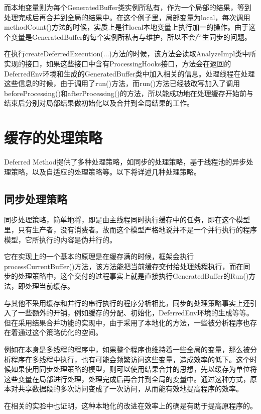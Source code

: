 而本地变量则为每个GeneratedBuffer类实例所私有，作为一个局部的结果，等到处理完成后再合并到全局的结果中。在这个例子里，局部变量为local，每次调用methodCount()方法的时候，实质上是往local本地变量上执行加一的操作。由于这个变量是GeneratedBuffer的每个实例所私有与维护，所以不会产生同步的问题。

在执行createDeferredExecution(...)方法的时候，该方法会读取AnalyzeImpl类中所实现的接口，如果这些接口中含有ProcessingHooks接口，方法会在返回的DeferredEnv环境和生成的GeneratedBuffer类中加入相关的信息。处理线程在处理这些信息的时候，由于调用了run()方法，而run()方法已经被改写加入了调用beforeProcessing()和afterProcessing()的方法，所以能成功地在处理缓存开始前与结束后分别对局部结果做初始化以及合并到全局结果的工作。

\section{缓存的处理策略}

Deferred Method提供了多种处理策略，如同步的处理策略，基于线程池的异步处理策略，以及自适应的处理策略等。以下将详述几种处理策略。

\subsection{同步处理策略}

同步处理策略，简单地将，即是由主线程同时执行缓存中的任务，即在这个模型里，只有生产者，没有消费者。故而这个模型严格地说并不是一个并行执行的程序模型，它所执行的内容是伪并行的。

它在实现上的一个基本的原理是在缓存满的时候，框架会执行processCurrentBuffer()方法，该方法能把当前缓存交付给处理线程执行，而在同步的处理策略中，这个交付的过程事实上就是直接执行GeneratedBuffer的Run()方法，即处理当前缓存。

与其他不采用缓存和并行的串行执行的程序分析相比，同步的处理策略事实上还引入了一些额外的开销，例如缓存的分配、初始化，DeferredEnv环境的生成等等。但在采用结果合并功能的实现中，由于采用了本地化的方法，一些被分析程序也存在着通过这个策略优化的空间。

例如在本身是多线程的程序中，如果整个程序也维持着一些全局的变量，那么被分析程序在多线程中执行，也有可能会频繁访问这些变量，造成效率的低下。这个时候如果使用同步处理策略的模型，则可以使用结果合并的思想，先以缓存为单位将这些变量在局部进行处理，处理完成后再合并到全局的变量中。通过这种方式，原本对共享数据段的多次访问变成了一次访问，从而能有效地提高程序的效率。

在相关的实验中也证明，这种本地化的改进在效率上的确是有助于提高原程序的。

